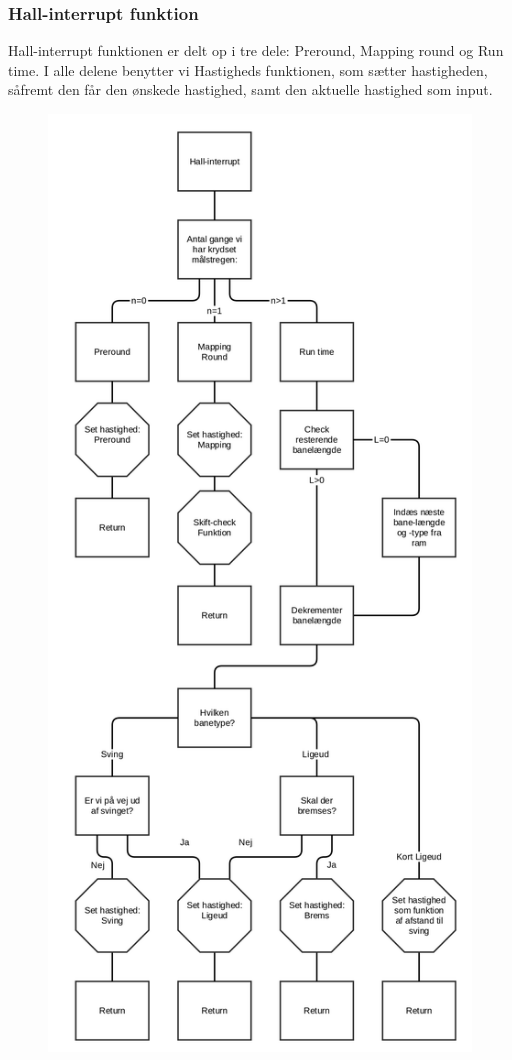 \subsubsection{Hall-interrupt funktion}
\label{Hall-funktion}

Hall-interrupt funktionen er delt op i tre dele: Preround, Mapping round og Run time. I alle delene benytter vi Hastigheds funktionen, som sætter hastigheden, såfremt den får den ønskede hastighed, samt den aktuelle hastighed som input.

\begin{figure}
\begin{center}
\includegraphics[scale=0.1]{Billeder/hall_interrupt.png}

\end{center}
\end{figure}
